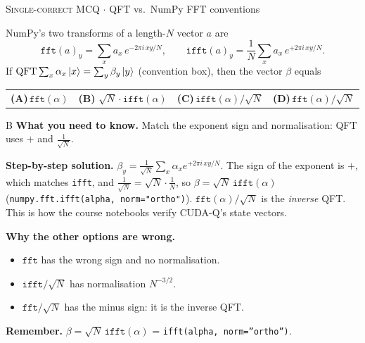 \documentclass[11pt,a4paper]{article}
\newcommand{\optlabel}[1]{\textbf{(#1)}}
\newcommand{\correctlabel}[1]{\textcolor{okgreen}{\textbf{(#1)}\,\ding{51}}}
\newenvironment{qitem}[1]{\begin{list}{}{\setlength{\leftmargin}{3.3em}\setlength{\labelwidth}{3.1em}%
  \setlength{\labelsep}{0.2em}\setlength{\topsep}{3pt}\setlength{\parsep}{3pt}}\item[\textbf{Q.#1}\hfill]}{\end{list}}
\newcommand{\qsep}{\par\vspace{2pt}{\color{black!15}\hrule}\vspace{4pt}}
\newcommand{\qmeta}[2]{{\footnotesize\color{black!60}\textsc{#1} \;$\cdot$\; #2}\par}
\begin{document}
\begin{qitem}{53}
\qmeta{Single-correct MCQ}{QFT vs.\ NumPy FFT conventions}
NumPy's two transforms of a length-$N$ vector $a$ are
\[ \texttt{fft}(a)_y = \sum_x a_x\, e^{-2\pi i\,xy/N}, \qquad \texttt{ifft}(a)_y = \frac1N\sum_x a_x\, e^{+2\pi i\,xy/N}. \]
If $\mathrm{QFT}\sum_x\alpha_x\ket x = \sum_y\beta_y\ket y$ (convention box), then the vector $\beta$ equals
\par\smallskip\noindent\begin{tabularx}{\linewidth}{@{}*{4}{L}@{}}
\optlabel{A}\,$\texttt{fft}(\alpha)$ & \correctlabel{B}\,$\sqrt N\cdot\texttt{ifft}(\alpha)$ & \optlabel{C}\,$\texttt{ifft}(\alpha)/\sqrt N$ & \optlabel{D}\,$\texttt{fft}(\alpha)/\sqrt N$
\end{tabularx}
\end{qitem}
\begin{solbox}{B}
\textbf{\color{brand}What you need to know.} Match the exponent sign and normalisation: QFT uses $+$ and $\frac{1}{\sqrt N}$.

\textbf{\color{brand}Step-by-step solution.} $\beta_y = \frac{1}{\sqrt N}\sum_x\alpha_x e^{+2\pi i\,xy/N}$. The sign of the exponent is $+$, which matches \texttt{ifft}, and
$\frac{1}{\sqrt N} = \sqrt N\cdot\frac1N$, so $\beta = \sqrt N\,\texttt{ifft}(\alpha)$ (\texttt{numpy.fft.ifft(alpha, norm="ortho")}).
$\texttt{fft}(\alpha)/\sqrt N$ is the \emph{inverse} QFT. This is how the course notebooks verify CUDA-Q's state vectors.

\textbf{\color{brand}Why the other options are wrong.}
\begin{itemize}[leftmargin=2.4em, itemsep=1pt, topsep=2pt]
\item[\textbf{(A)}] $\texttt{fft}$ has the wrong sign and no normalisation.
\item[\textbf{(C)}] $\texttt{ifft}/\sqrt N$ has normalisation $N^{-3/2}$.
\item[\textbf{(D)}] $\texttt{fft}/\sqrt N$ has the minus sign: it is the inverse QFT.
\end{itemize}
\textbf{\color{brand}Remember.} $\beta = \sqrt N\,\texttt{ifft}(\alpha)$ = \texttt{ifft(alpha, norm=''ortho'')}.
\end{solbox}
\qsep
\end{document}
